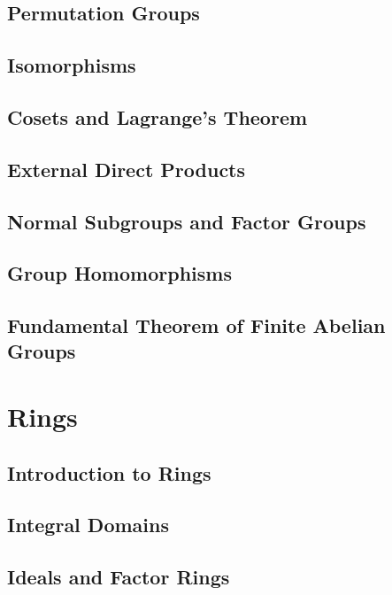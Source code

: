 \documentclass[a4paper, 12pt]{report}
\begin{document}
	\chapter{Permutation Groups}
	
	
	\chapter{Isomorphisms}
	
	
	\chapter{Cosets and Lagrange's Theorem}
	
	
	\chapter{External Direct Products}
	
	
	\chapter{Normal Subgroups and Factor Groups}
	
	
	\chapter{Group Homomorphisms}
	
	
	\chapter{Fundamental Theorem of Finite Abelian Groups}
	


\part{Rings}
	\chapter{Introduction to Rings}
	
	
	\chapter{Integral Domains}
	
	
	\chapter{Ideals and Factor Rings}
	
	
\end{document}
